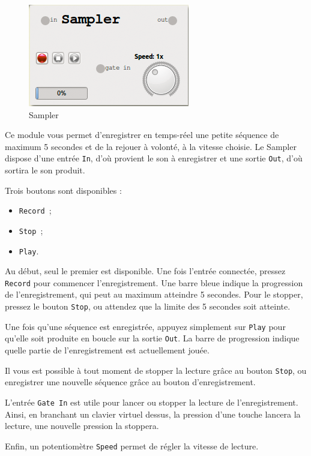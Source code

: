 \documentclass[a4paper,oneside,frenchb,12pt]{article}
\begin{document}
\begin{figure}[h!]
\centering
\includegraphics[scale=0.5]{../img/png/sampler.png}
\caption{Sampler}
\end{figure}

Ce module vous permet d'enregistrer en temps-réel une petite séquence de
maximum 5 secondes et de la rejouer à volonté, à la vitesse choisie. Le
Sampler dispose d'une entrée \verb!In!, d'où provient le son à
enregistrer et une sortie \verb!Out!, d'où sortira le son produit.

Trois boutons sont disponibles :

\begin{itemize}
\item
  \verb!Record!~;
\item
  \verb!Stop!~;
\item
  \verb!Play!.
\end{itemize}
Au début, seul le premier est disponible. Une fois l'entrée connectée,
pressez \verb!Record! pour commencer l'enregistrement. Une barre bleue
indique la progression de l'enregistrement, qui peut au maximum
atteindre 5 secondes. Pour le stopper, pressez le bouton \verb!Stop!, ou
attendez que la limite des 5 secondes soit atteinte.

Une fois qu'une séquence est enregistrée, appuyez simplement sur
\verb!Play! pour qu'elle soit produite en boucle sur la sortie
\verb!Out!. La barre de progression indique quelle partie de
l'enregistrement est actuellement jouée.

Il vous est possible à tout moment de stopper la lecture grâce au bouton
\verb!Stop!, ou enregistrer une nouvelle séquence grâce au bouton
d'enregistrement.

L'entrée \verb!Gate In! est utile pour lancer ou stopper la lecture de
l'enregistrement. Ainsi, en branchant un clavier virtuel dessus, la
pression d'une touche lancera la lecture, une nouvelle pression la
stoppera.

Enfin, un potentiomètre \verb!Speed! permet de régler la vitesse de
lecture.
\end{document}
